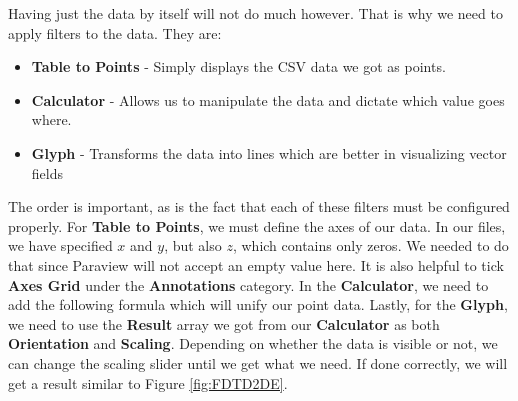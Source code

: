 Having just the data by itself will not do much however. That is why we need to apply filters to the data. They are:

\begin{itemize}
	\item \textbf{Table to Points} - Simply displays the CSV data we got as points.
	\item \textbf{Calculator} - Allows us to manipulate the data and dictate which value goes where.
	\item \textbf{Glyph} - Transforms the data into lines which are better in visualizing vector fields
\end{itemize}

The order is important, as is the fact that each of these filters must be configured properly. For \textbf{Table to Points}, we must define the axes of our data. In our files, we have specified $x$ and $y$, but also $z$, which contains only zeros. We needed to do that since Paraview will not accept an empty value here. It is also helpful to tick \textbf{Axes Grid} under the \textbf{Annotations} category. In the \textbf{Calculator}, we need to add the following formula  which will unify our point data. Lastly, for the \textbf{Glyph}, we need to use the \textbf{Result} array we got from our \textbf{Calculator} as both \textbf{Orientation} and \textbf{Scaling}. Depending on whether the data is visible or not, we can change the scaling slider until we get what we need. If done correctly, we will get a result similar to Figure \ref{fig:FDTD2DE}.


